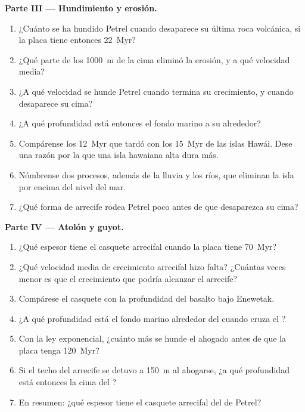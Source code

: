 \begin{problem}
\noindent\textbf{Parte III --- Hundimiento y erosión.}
\begin{enumerate}[resume]
  \item ¿Cuánto se ha hundido Petrel cuando desaparece su última roca volcánica, si la placa tiene
        entonces \qty{22}{Myr}?
  \item ¿Qué parte de los \qty{1000}{m} de la cima eliminó la erosión, y a qué velocidad media?
  \item ¿A qué velocidad se hunde Petrel cuando termina su crecimiento, y cuando desaparece su cima?
  \item ¿A qué profundidad está entonces el fondo marino a su alrededor?
  \item Compárense los \qty{12}{Myr} que tardó con los \qty{15}{Myr} de las islas Hawái. Dese una
        razón por la que una isla hawaiana alta dura más.
  \item Nómbrense dos procesos, además de la lluvia y los ríos, que eliminan la isla por encima del nivel del mar.
  \item ¿Qué forma de arrecife rodea Petrel poco antes de que desaparezca su cima?
\end{enumerate}

\noindent\textbf{Parte IV --- Atolón y guyot.}
\begin{enumerate}[resume]
  \item ¿Qué espesor tiene el casquete arrecifal cuando la placa tiene \qty{70}{Myr}?
  \item ¿Qué velocidad media de crecimiento arrecifal hizo falta? ¿Cuántas veces menor es que el crecimiento
        que podría alcanzar el arrecife?
  \item Compárese el casquete con la profundidad del basalto bajo Enewetak.
  \item ¿A qué profundidad está el fondo marino alrededor del  cuando cruza el ?
  \item Con la ley exponencial, ¿cuánto más se hunde el  ahogado antes de que la placa tenga
        \qty{120}{Myr}?
  \item Si el techo del arrecife se detuvo a \qty{150}{m} al ahogarse, ¿a qué profundidad está entonces la cima del
        ?
  \item En resumen: ¿qué espesor tiene el casquete arrecifal del  de Petrel?
\end{enumerate}
\end{problem}
